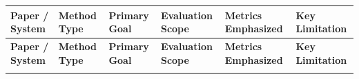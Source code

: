 \documentclass[12pt, a4paper]{article}
\begin{document}
\begin{singlespace}
\small
\begin{longtable}{>{\raggedright\arraybackslash}p{2cm} >{\raggedright\arraybackslash}p{2cm} >{\raggedright\arraybackslash}p{2cm} >{\raggedright\arraybackslash}p{2.5cm} >{\raggedright\arraybackslash}p{2cm} >{\raggedright\arraybackslash}p{2.5cm}}
\toprule
\textbf{Paper / System} & \textbf{Method Type} & \textbf{Primary Goal} & \textbf{Evaluation Scope} & \textbf{Metrics Emphasized} & \textbf{Key Limitation} \\
\midrule
\endfirsthead
\toprule
\textbf{Paper / System} & \textbf{Method Type} & \textbf{Primary Goal} & \textbf{Evaluation Scope} & \textbf{Metrics Emphasized} & \textbf{Key Limitation} \\
\midrule
\endhead
\bottomrule
\endfoot


\end{longtable}
\end{singlespace}
\end{document}
